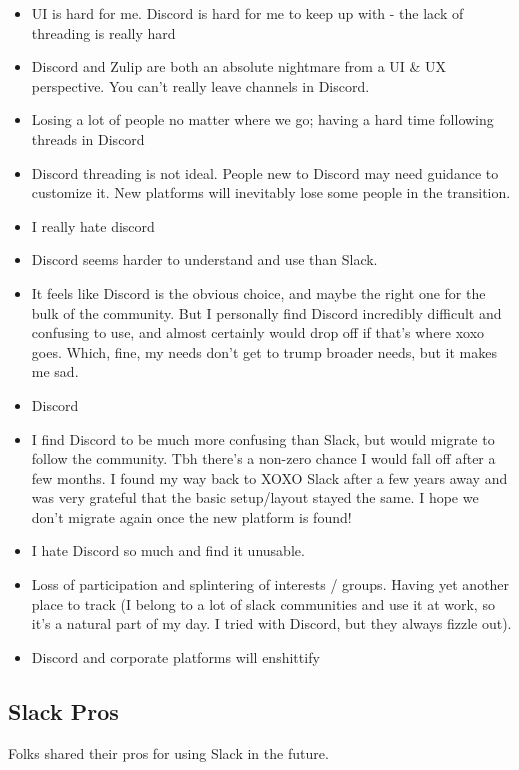 \documentclass[
]{book}
\providecommand{\tightlist}{%
  \setlength{\itemsep}{0pt}\setlength{\parskip}{0pt}}
\begin{document}
\begin{itemize}
\tightlist
\item
  UI is hard for me. Discord is hard for me to keep up with - the lack of threading is really hard
\item
  Discord and Zulip are both an absolute nightmare from a UI \& UX perspective. You can't really leave channels in Discord.
\item
  Losing a lot of people no matter where we go; having a hard time following threads in Discord
\item
  Discord threading is not ideal. People new to Discord may need guidance to customize it. New platforms will inevitably lose some people in the transition.
\item
  I really hate discord
\item
  Discord seems harder to understand and use than Slack.
\item
  It feels like Discord is the obvious choice, and maybe the right one for the bulk of the community. But I personally find Discord incredibly difficult and confusing to use, and almost certainly would drop off if that's where xoxo goes. Which, fine, my needs don't get to trump broader needs, but it makes me sad.
\item
  Discord
\item
  I find Discord to be much more confusing than Slack, but would migrate to follow the community. Tbh there's a non-zero chance I would fall off after a few months. I found my way back to XOXO Slack after a few years away and was very grateful that the basic setup/layout stayed the same. I hope we don't migrate again once the new platform is found!
\item
  I hate Discord so much and find it unusable.
\item
  Loss of participation and splintering of interests / groups. Having yet another place to track (I belong to a lot of slack communities and use it at work, so it's a natural part of my day. I tried with Discord, but they always fizzle out).
\item
  Discord and corporate platforms will enshittify
\end{itemize}

\subsection{Slack Pros}\label{slack-pros}

Folks shared their pros for using Slack in the future.
\end{document}
